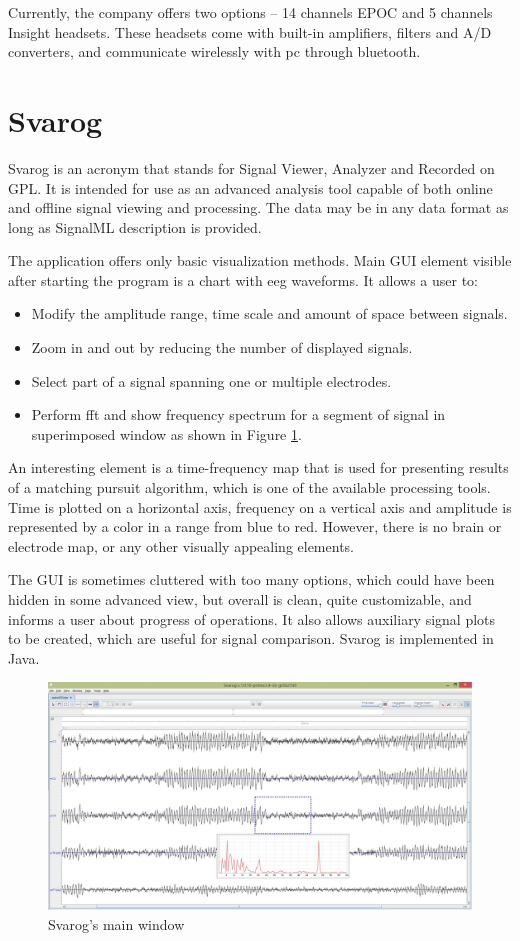 Currently, the company offers two options -- 14 channels EPOC and 5 channels Insight
headsets. These headsets come with built-in amplifiers, filters and A/D
converters, and communicate wirelessly with \gls{pc} through bluetooth.

\section{Svarog}
Svarog is an acronym that stands for Signal Viewer, Analyzer and Recorded on GPL. 
It is intended for use as an advanced analysis tool capable
of both online and offline signal viewing and processing. The data may be in any
data format as long as SignalML description is provided.

The application offers only basic visualization methods. Main GUI element
visible after starting the program is a chart with \gls{eeg} waveforms. It allows a user to:
\begin{itemize}
	\item Modify the amplitude range, time scale and amount of space between signals.
	\item Zoom in and out by reducing the number of displayed signals. 
	\item Select part of a signal spanning one or multiple electrodes.
	\item Perform \gls{fft} and show frequency spectrum for a segment of signal in superimposed window as shown in Figure \ref{fig:svarog}.
\end{itemize}
An interesting element is a time-frequency map that is
used for presenting results of a matching pursuit algorithm, which is one of the available
processing tools. Time is plotted on a horizontal axis, frequency on a vertical axis and
amplitude is represented by a color in a range from blue to red. However, there is
no brain or electrode map, or any other visually appealing elements.

The GUI is sometimes cluttered with too many options, which could have been
hidden in some advanced view, but overall is clean, quite customizable, and
informs a user about progress of operations. It also allows auxiliary
signal plots to be created, which are useful for signal comparison. Svarog is implemented in Java.

\begin{figure}[htb]
	\centering
	\includegraphics[width=0.8\linewidth]{fig/svarog.jpg}
	\caption{Svarog's main window}
	\label{fig:svarog}
\end{figure}

